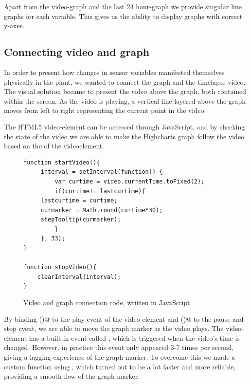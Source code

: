 Apart from the video-graph and the last 24 hour-graph we provide singular line graphs for each variable. This gives us the ability to display graphs with correct y-axes. 

\subsection{Connecting video and graph}
In order to present how changes in sensor variables manifested themselves physically in the plant, we wanted to connect the graph and the timelapse video. The visual solution became to present the video above the graph, both contained within the screen. As the video is playing, a vertical line layered above the graph moves from left to right representing the current point in the video. 

The HTML5 video-element can be accessed through JavaScript, and by checking the state of the video we are able to make the Highcharts graph follow the video based on the \verb@currentTime@ of the videoelement.

\begin{figure}
	\begin{lstlisting}[style=htmlcssjs]
function startVideo(){
	 interval = setInterval(function() {
		 var curtime = video.currentTime.toFixed(2);
		 if(curtime!= lastcurtime){
	 lastcurtime = curtime;
	 curmarker = Math.round(curtime*30);
	 stepTooltip(curmarker);
		 }
	 }, 33);
}

function stopVideo(){
	clearInterval(interval);
}
	\end{lstlisting}
	\caption{Video and graph connection code, written in JavaScript}
	\label{fig:videocode}
\end{figure}

By binding \verb@startVideo()@ to the play-event of the video-element and \verb@stopVideo()@ to the pause and stop event, we are able to move the graph marker as the video plays. The video-element has a built-in event called \verb@timeupdate@, which is triggered when the video's time is changed. However, in practice this event only appeared 3-7 times per second, giving a lagging experience of the graph marker. To overcome this we made a custom function using \verb@setInterval@, which turned out to be a lot faster and more reliable, providing a smooth flow of the graph marker. 


